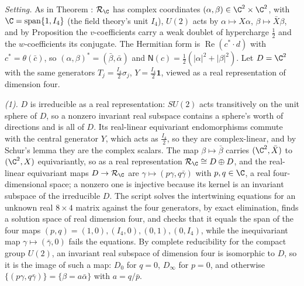 \emph{Setting.} As in Theorem : $\mathcal{R}_{\C}$ has complex coordinates $(\alpha, \beta) \in \C^{2} \times \C^{2}$, with $\C = \mathrm{span}\{1, I_{4}\}$ (the field theory's unit $I_{4}$), $U(2)$ acts by $\alpha \mapsto X\alpha$, $\beta \mapsto \bar{X}\beta$, and by Proposition  the $v$-coefficients carry a weak doublet of hypercharge $\tfrac12$ and the $w$-coefficients its conjugate. The Hermitian form is $\operatorname{Re}(c^{*}\cdot d)$ with $c^{*} = \theta(\bar{c})$, so $(\alpha, \beta)^{*} = (\bar{\beta}, \bar{\alpha})$ and $\mathsf{N}(c) = \tfrac12(|\alpha|^{2} + |\beta|^{2})$. Let $D = \C^{2}$ with the same generators $T_{j} = \tfrac{I_{4}}{2}\sigma_{j}$, $Y = \tfrac{I_{4}}{2}\mathbf{1}$, viewed as a real representation of dimension four.

\emph{(1).} $D$ is irreducible as a real representation: $SU(2)$ acts transitively on the unit sphere of $D$, so a nonzero invariant real subspace contains a sphere's worth of directions and is all of $D$. Its real-linear equivariant endomorphisms commute with the central generator $Y$, which acts as $\tfrac{I_{4}}{2}$, so they are complex-linear, and by Schur's lemma they are the complex scalars. The map $\beta \mapsto \bar{\beta}$ carries $(\C^{2}, \bar{X})$ to $(\C^{2}, X)$ equivariantly, so as a real representation $\mathcal{R}_{\C} \cong D \oplus D$, and the real-linear equivariant maps $D \to \mathcal{R}_{\C}$ are $\gamma \mapsto (p\gamma, q\bar{\gamma})$ with $p, q \in \C$, a real four-dimensional space; a nonzero one is injective because its kernel is an invariant subspace of the irreducible $D$. The script solves the intertwining equations for an unknown real $8 \times 4$ matrix against the four generators, by exact elimination, finds a solution space of real dimension four, and checks that it equals the span of the four maps $(p, q) = (1, 0), (I_{4}, 0), (0, 1), (0, I_{4})$, while the inequivariant map $\gamma \mapsto (\bar{\gamma}, 0)$ fails the equations. By complete reducibility for the compact group $U(2)$, an invariant real subspace of dimension four is isomorphic to $D$, so it is the image of such a map: $D_{0}$ for $q = 0$, $D_{\infty}$ for $p = 0$, and otherwise $\{(p\gamma, q\bar{\gamma})\} = \{\beta = a\bar{\alpha}\}$ with $a = q/\bar{p}$.

